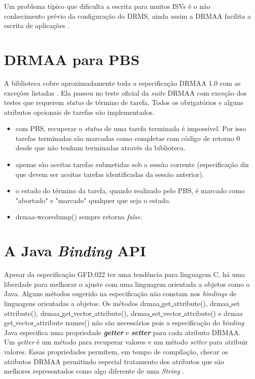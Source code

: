 Um problema típico que dificulta a escrita para muitos ISVs é o não conhecimento prévio da configuração do DRMS, ainda assim a DRMAA facilita a escrita de aplicações \cite{Rajic2002}.

\section{DRMAA para PBS}

A biblioteca cobre aproximadamente toda a especificação DRMAA 1.0 com as exceções listadas \cite{drmaa_pbs}. Ela passou no teste oficial da \emph{suite} DRMAA com exceção dos testes que requerem \emph{status} de término de tarefa. Todos os obrigatórios e alguns atributos opcionais de tarefas são implementados.

\begin{itemize}
	\item com PBS, recuperar o \emph{status} de uma tarefa terminada é impossível. Por isso tarefas terminadas são marcadas como completas com código de retorno 0 desde que não tenham terminadas através da biblioteca.
	\item apenas são aceitas tarefas submetidas sob a sessão corrente (especificação diz que devem ser aceitas tarefas identificadas da sessão anterior).
	\item o estado do término da tarefa, quando realizado pelo PBS, é marcado como "abortado"  e  "marcado" qualquer que seja o estado.
	\item drmaa-wcoredump() sempre retorna \emph{false}.
\end{itemize}

\section{A Java \emph{Binding} API}

Apesar da especificação GFD.022 ter uma tendência para linguagem C, há uma liberdade para melhorar o ajuste com uma linguagem orientada a objetos como o Java. Alguns métodos sugerido na especificação não constam nos \emph{bindings} de linguagens orientadas a objetos. Os métodos drmaa\underline{ }get\underline{ }attribute(), drmaa\underline{ }set\underline{ }attribute(), drmaa\underline{ }get\underline{ }vector\underline{ }attribute(), drmaa\underline{ }set\underline{ }vector\underline{ }attribute() e drmaa\underline{ }get\underline{ }vector\underline{ } attribute \underline{ }names() não são necessários pois a especificação do \emph{binding} Java especifica uma propriedade \emph{\textbf{getter}} e \emph{\textbf{setter}} para cada atributo DRMAA. Um \emph{getter} é um método para recuperar valores e um método \emph{setter} para atribuir valores. Essas propriedades permitem, em tempo de compilação, checar os atributos DRMAA permitindo especial tratamento dos atributos que são melhores representados como algo diferente de uma \emph{String} \cite{Templeton2003}.

